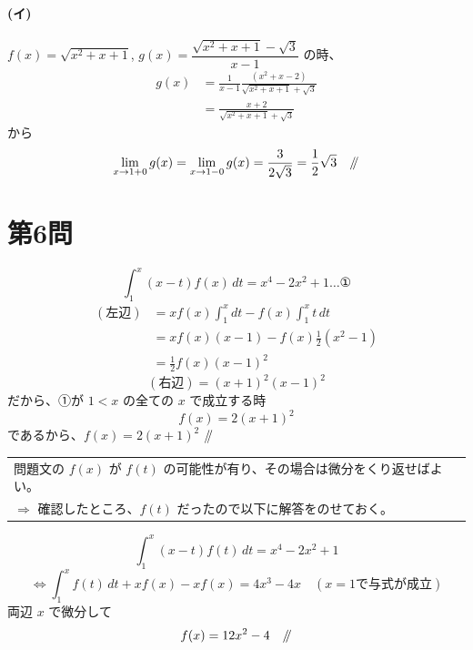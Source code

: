 \documentclass[../main.tex]{subfiles}
\begin{document}
\paragraph{(イ)} $f(x) = \sqrt{x^2 + x + 1}$, $g(x) = \dfrac{\sqrt{x^2 + x + 1} - \sqrt{3}}{x - 1}$ の時、
\begin{align*}
  g(x) &= \frac{1}{x - 1} \frac{(x^2 + x - 2)}{\sqrt{x^2 + x + 1} + \sqrt{3}} \\
  &= \frac{x + 2}{\sqrt{x^2 + x + 1} + \sqrt{3}}
\end{align*}
から
\[
  \lim_{x \to 1+0} g(x) = \lim_{x \to 1-0} g(x) = \frac{3}{2\sqrt{3}} = \frac{1}{2}\sqrt{3} \quad \mathbin{/\mkern-5mu/}
\]

\newpage

\section*{第6問}

\noindent
[\textbf{解}]
\[
  \int_1^x (x - t) f(x) \, dt = x^4 - 2x^2 + 1 \dots \text{①}
\]
\begin{align*}
  (\text{左辺}) &= x f(x) \int_1^x dt - f(x) \int_1^x t \, dt \\
  &= x f(x) (x - 1) - f(x) \frac{1}{2} (x^2 - 1) \\
  &= \frac{1}{2} f(x) (x - 1)^2
\end{align*}
\[
  (\text{右辺}) = (x + 1)^2 (x - 1)^2
\]
だから、①が $1 < x$ の全ての $x$ で成立する時
\[
  f(x) = 2(x + 1)^2
\]
であるから、$f(x) = 2(x + 1)^2$ \hfill $\mathbin{/\mkern-5mu/}$

\bigskip

\begin{center}
  \begin{tabular}{|l|}
    \hline
    問題文の $f(x)$ が $f(t)$ の可能性が有り、その場合は微分をくり返せばよい。\\
    $\Rightarrow$ 確認したところ、$f(t)$ だったので以下に解答をのせておく。\\
    \hline
  \end{tabular}
\end{center}

\bigskip

\noindent
[\textbf{解2}]
\[
  \int_1^x (x - t) f(t) \, dt = x^4 - 2x^2 + 1
\]
\[
  \iff \int_1^x f(t) \, dt + x f(x) - x f(x) = 4x^3 - 4x \quad (x = 1 \text{で与式が成立})
\]
両辺 $x$ で微分して
\[
  f(x) = 12x^2 - 4 \quad \mathbin{/\mkern-5mu/}
\]
\end{document}
